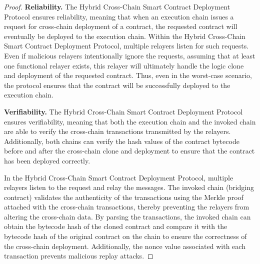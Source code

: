 \begin{proof}
\noindent
\textbf{Reliability. }
The Hybrid Cross-Chain Smart Contract Deployment Protocol ensures reliability, meaning that when an execution chain issues a request for cross-chain deployment of a contract, the requested contract will eventually be deployed to the execution chain. 
Within the Hybrid Cross-Chain Smart Contract Deployment Protocol, multiple relayers listen for such requests. Even if malicious relayers intentionally ignore the requests, assuming that at least one functional relayer exists, this relayer will ultimately handle the logic clone and deployment of the requested contract. Thus, even in the worst-case scenario, the protocol ensures that the contract will be successfully deployed to the execution chain.

\vspace{3pt}
\noindent
\textbf{Verifiability. }
The Hybrid Cross-Chain Smart Contract Deployment Protocol ensures verifiability, meaning that both the execution chain and the invoked chain are able to verify the cross-chain transactions transmitted by the relayers. 
Additionally, both chains can verify the hash values of the contract bytecode before and after the cross-chain clone and deployment to ensure that the contract has been deployed correctly. 

In the Hybrid Cross-Chain Smart Contract Deployment Protocol, multiple relayers listen to the request and relay the messages. 
The invoked chain (bridging contract) validates the authenticity of the transactions using the Merkle proof attached with the cross-chain transactions, thereby preventing the relayers from altering the cross-chain data. 
By parsing the transactions, the invoked chain can obtain the bytecode hash of the cloned contract and compare it with the bytecode hash of the original contract on the chain to ensure the correctness of the cross-chain deployment. 
Additionally, the nonce value associated with each transaction prevents malicious replay attacks.


\end{proof}
